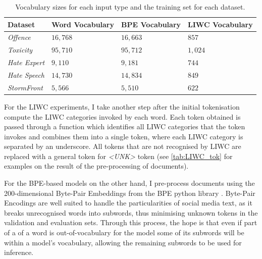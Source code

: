 \begin{table}[]  
  \centering  
  \begin{tabular}{llll}  
    Dataset              & Word Vocabulary & BPE Vocabulary & LIWC Vocabulary \\\hline  
    \textit{Offence}     & $16,768$        & $16,663$       & $857$           \\  
    \textit{Toxicity}    & $95,710$        & $95,712$       & $1,024$         \\  
    \textit{Hate Expert} & $9,110$         & $9,181$        & $744$           \\  
    \textit{Hate Speech} & $14,730$        & $14,834$       & $849$           \\  
    \textit{StormFront}  & $5,566$         & $5,510$        & $622$  
  \end{tabular}  
  \caption{Vocabulary sizes for each input type and the training set for each dataset.}  
  \label{tab:vocab_sizes}  
\end{table}  
  
For the LIWC experiments, I take another step after the initial tokenisation  compute the LIWC categories invoked by each word.  
Each token obtained is passed through a function which identifies all LIWC categories that the token invokes and combines them into a single token, where each LIWC category is separated by an underscore.  
All tokens that are not recognised by LIWC are replaced with a general token for \textit{<UNK>} token (see \cref{tab:LIWC_tok} for examples on the result of the pre-processing of documents).  
  
For the BPE-based models on the other hand, I pre-process documents  using the 200-dimensional Byte-Pair Embeddings from the BPE python library \citep{Heinzerling:2018}.  
Byte-Pair Encodings are well suited to handle the particularities of social media text, as it breaks unrecognised words into  subwords, thus minimising unknown tokens in the validation and evaluation sets.  
Through this process, the hope is that even if part of a of a word is out-of-vocabulary for the model some of its subwords will be within a model's vocabulary, allowing the remaining subwords to be used for inference.  
  
\begin{table}  
  \centering  
  \caption{Word token and BPE representation.}  
  \label{tab:bpe_tok}  
\end{table}  
  
